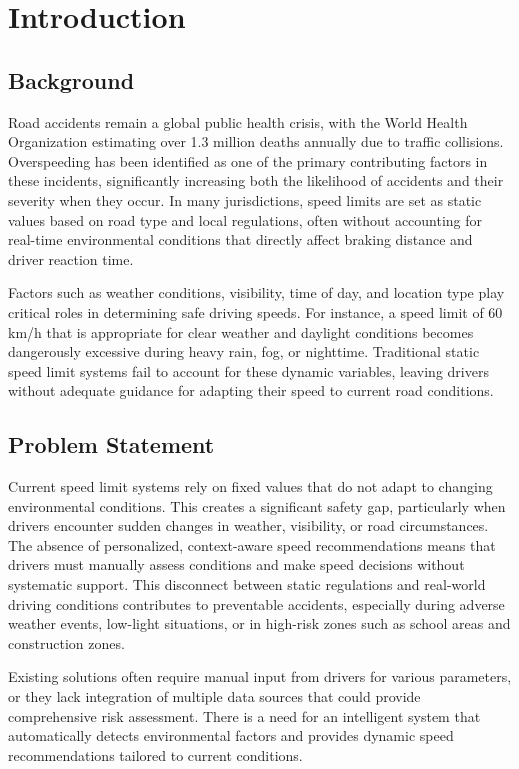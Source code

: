 \chapter{Introduction}
\label{chapter:introduction}

\section{Background}
Road accidents remain a global public health crisis, with the World Health Organization estimating over 1.3 million deaths annually due to traffic collisions. Overspeeding has been identified as one of the primary contributing factors in these incidents, significantly increasing both the likelihood of accidents and their severity when they occur. In many jurisdictions, speed limits are set as static values based on road type and local regulations, often without accounting for real-time environmental conditions that directly affect braking distance and driver reaction time.

Factors such as weather conditions, visibility, time of day, and location type play critical roles in determining safe driving speeds. For instance, a speed limit of 60 km/h that is appropriate for clear weather and daylight conditions becomes dangerously excessive during heavy rain, fog, or nighttime. Traditional static speed limit systems fail to account for these dynamic variables, leaving drivers without adequate guidance for adapting their speed to current road conditions.

\section{Problem Statement}
Current speed limit systems rely on fixed values that do not adapt to changing environmental conditions. This creates a significant safety gap, particularly when drivers encounter sudden changes in weather, visibility, or road circumstances. The absence of personalized, context-aware speed recommendations means that drivers must manually assess conditions and make speed decisions without systematic support. This disconnect between static regulations and real-world driving conditions contributes to preventable accidents, especially during adverse weather events, low-light situations, or in high-risk zones such as school areas and construction zones.

Existing solutions often require manual input from drivers for various parameters, or they lack integration of multiple data sources that could provide comprehensive risk assessment. There is a need for an intelligent system that automatically detects environmental factors and provides dynamic speed recommendations tailored to current conditions.

